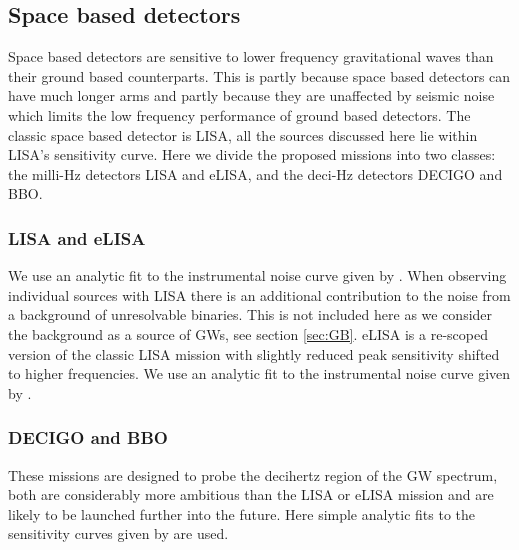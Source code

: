 \subsection{Space based detectors}
Space based detectors are sensitive to lower frequency gravitational waves than their ground based counterparts. This is partly because space based detectors can have much longer arms and partly because they are unaffected by seismic noise which limits the low frequency performance of ground based detectors. The classic space based detector is LISA, all the sources discussed here lie within LISA's sensitivity curve. Here we divide the proposed missions into two classes: the milli-Hz detectors LISA and eLISA, and the deci-Hz detectors DECIGO and BBO.

\subsubsection{LISA and eLISA}
We use an analytic fit to the instrumental noise curve given by \cite{Sathyaprakash}. When observing individual sources with LISA there is an additional contribution to the noise from a background of unresolvable binaries. This is not included here as we consider the background as a source of GWs, see section \ref{sec:GB}. eLISA is a re-scoped version of the classic LISA mission with slightly reduced peak sensitivity shifted to higher frequencies. We use an analytic fit to the instrumental noise curve given by \cite{DoingScienceWitheLISA}.
\subsubsection{DECIGO and BBO}
These missions are designed to probe the decihertz region of the GW spectrum, both are considerably more ambitious than the LISA or eLISA mission and are likely to be launched further into the future. Here simple analytic fits to the sensitivity curves given by \cite{2011PhRvD..83d4011Y} are used.





